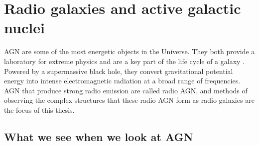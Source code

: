 \section{Radio galaxies and active galactic nuclei}
\label{sec:agn}

    AGN are some of the most energetic objects in the Universe. They both provide a laboratory for extreme physics and are a key part of the life cycle of a galaxy \citep{heckman_coevolution_2014}. Powered by a supermassive black hole, they convert gravitational potential energy into intense electromagnetic radiation at a broad range of frequencies. AGN that produce strong radio emission are called radio AGN, and methods of observing the complex structures that these radio AGN form as radio galaxies are the focus of this thesis.

    \subsection{What we see when we look at AGN}
    \label{sec:what-we-see-agn}

